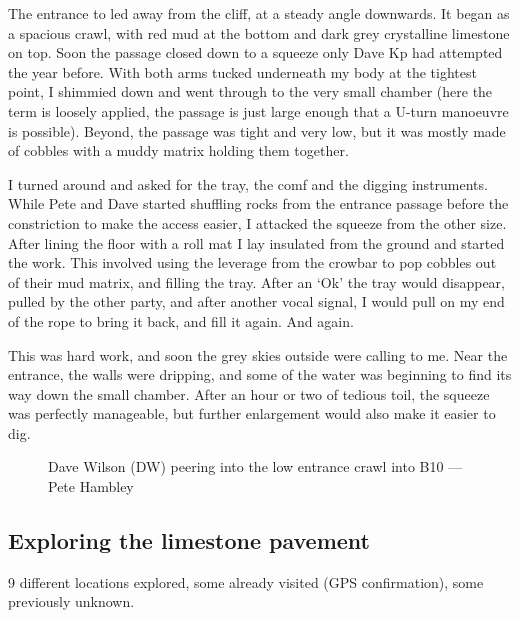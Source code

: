 The entrance to  led away from the cliff, at a steady angle downwards. It began as a spacious crawl, with red mud at the bottom and dark grey crystalline limestone on top. Soon the passage closed down to a squeeze only Dave Kp had attempted the year before. With both arms tucked underneath my body at the tightest point, I shimmied down and went through to the very small chamber (here the term is loosely applied, the passage is just large enough that a U-turn manoeuvre is possible). Beyond, the passage was tight and very low, but it was mostly made of cobbles with a muddy matrix holding them together.

I turned around and asked for the tray, the comf and the digging instruments. While Pete and Dave started shuffling rocks from the entrance passage before the constriction to make the access easier, I attacked the squeeze from the other size. After lining the floor with a roll mat I lay insulated from the ground and started the work. This involved using the leverage from the crowbar to pop cobbles out of their mud matrix, and filling the tray. After an `Ok' the tray would disappear, pulled by the other party, and after another vocal signal, I would pull on my end of the rope to bring it back, and fill it again. And again.

This was hard work, and soon the grey skies outside were calling to me. Near the entrance, the walls were dripping, and some of the water was beginning to find its way down the small chamber. After an hour or two of tedious toil, the squeeze was perfectly manageable, but further enlargement would also make it easier to dig.

\begin{figure*}[t!]
	\checkoddpage \ifoddpage \forcerectofloat \else \forceversofloat \fi
	\centering
	\label{dw jailbreak}
	\caption{Dave Wilson (DW) peering into the low entrance crawl into B10 --- Pete Hambley}
\end{figure*}


\subsection{Exploring the limestone pavement}
\label{sec:limestone pavement}
9 different locations explored, some already visited (GPS confirmation), some previously unknown.


